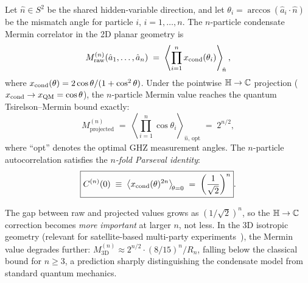 \begin{theorem}
\label{P9:thm:GHZ}
Let $\hat{n}\in S^2$ be the shared hidden-variable direction, and let
$\theta_i = \arccos(\hat{a}_i\cdot\hat{n})$ be the mismatch angle for
particle $i$, $i=1,\ldots,n$.
The $n$-particle condensate Mermin correlator in the 2D planar geometry is
\begin{equation}
  M_\mathrm{raw}^{(n)}(\hat{a}_1,\ldots,\hat{a}_n)
  \;=\; \left\langle\prod_{i=1}^n x_{\mathrm{cond}}(\theta_i)\right\rangle_{\!\hat{n}},
  \label{P9:eq:Mermin_raw}
\end{equation}
where $x_{\mathrm{cond}}(\theta) = 2\cos\theta/(1+\cos^2\theta)$.
Under the pointwise $\mathbb{H}\to\mathbb{C}$ projection ($x_{\mathrm{cond}}\to x_\mathrm{QM}=\cos\theta$),
the $n$-particle Mermin value reaches the quantum Tsirelson--Mermin
bound exactly:
\begin{equation}
  M_\mathrm{projected}^{(n)}
  \;=\; \left\langle\prod_{i=1}^n \cos\theta_i\right\rangle_{\!\hat{n},\,\mathrm{opt}}
  \;=\; 2^{n/2},
  \label{P9:eq:Mermin_QM}
\end{equation}
where ``opt'' denotes the optimal GHZ measurement angles.
The $n$-particle autocorrelation satisfies the \emph{$n$-fold Parseval identity}:
\begin{equation}
  \boxed{C^{(n)}(0)
  \;\equiv\; \left\langle x_{\mathrm{cond}}(\theta)^{2n}\right\rangle_{\!\theta=0}
  \;=\; \left(\frac{1}{\sqrt{2}}\right)^n}.
  \label{P9:eq:parseval_n}
\end{equation}
\end{theorem}

\begin{remark}
\label{P9:rem:n_particle_prediction}
The gap between raw and projected values grows as $(1/\sqrt{2})^n$, so
the $\mathbb{H}\to\mathbb{C}$ correction becomes \emph{more important} at larger $n$,
not less.
In the 3D isotropic geometry (relevant for satellite-based multi-party
experiments~\cite{Paper8}), the Mermin value degrades further:
$M^{(n)}_\mathrm{3D}\approx 2^{n/2}\cdot(8/15)^n/R_n$,
falling below the classical bound for $n\geq3$, a prediction sharply
distinguishing the condensate model from standard quantum mechanics.
\end{remark}

